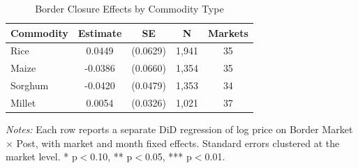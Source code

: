 \begin{table}[H]
\centering
\caption{Border Closure Effects by Commodity Type}
\label{tab:commodity}
\begin{threeparttable}
\begin{tabular}{lcccc}
\toprule
Commodity & Estimate & SE & N & Markets \\
\midrule
Rice & 0.0449 & (0.0629) & 1,941 & 35 \\
Maize & -0.0386 & (0.0660) & 1,354 & 35 \\
Sorghum & -0.0420 & (0.0479) & 1,353 & 34 \\
Millet & 0.0054 & (0.0326) & 1,021 & 37 \\
\bottomrule
\end{tabular}
\begin{tablenotes}[flushleft]
\small
\item \emph{Notes:} Each row reports a separate DiD regression of log price on Border Market $\times$ Post, with market and month fixed effects. Standard errors clustered at the market level. * p$<$0.10, ** p$<$0.05, *** p$<$0.01.
\end{tablenotes}
\end{threeparttable}
\end{table}


